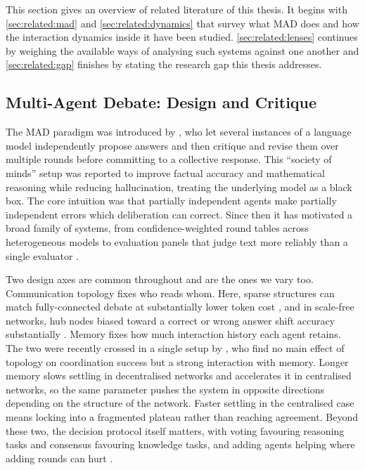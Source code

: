 This section gives an overview of related literature of this thesis. It begins 
with \autoref{sec:related:mad} and \autoref{sec:related:dynamics} that survey what
\ac{MAD} does and how the interaction dynamics inside it have been
studied. \autoref{sec:related:lenses} continues by weighing the available ways of analysing such
systems against one another and \autoref{sec:related:gap} finishes by 
stating the research gap this thesis addresses.

\subsection{Multi-Agent Debate: Design and Critique}
\label{sec:related:mad}

The \ac{MAD} paradigm was introduced by
\citet{du2024improving}, who let several instances of a language model
independently propose answers and then critique and revise them over multiple
rounds before committing to a collective response. This ``society of minds'' setup
was reported to improve factual accuracy and mathematical reasoning while
reducing hallucination, treating the underlying model as a black box. The core
intuition was that partially independent agents make partially independent errors
which deliberation can correct. Since then it has motivated a broad family
of systems, from confidence-weighted round tables across heterogeneous models
\citep{chen2024reconcile} to evaluation panels that judge text more reliably
than a single evaluator \citep{chan2024chateval}.

Two design axes are common throughout and are the ones we vary too.
Communication topology fixes who reads whom. Here, sparse structures can match
fully-connected debate at substantially lower token cost
\citep{li2024sparsetopology}, and in scale-free networks, hub nodes biased toward
a correct or wrong answer shift accuracy substantially \citep{liu2025problemsolving}. Memory
fixes how much interaction history each agent retains. The two were recently
crossed in a single setup by \citet{mehdizadeh2026topologymemory}, who find
no main effect of topology on coordination success but a strong interaction with
memory. Longer memory slows settling in decentralised networks and accelerates
it in centralised networks, so the same parameter pushes the system in opposite
directions depending on the structure of the network. Faster settling in the centralised
case means locking into a fragmented plateau rather than reaching
agreement. Beyond these two, the decision protocol itself matters, with voting
favouring reasoning tasks and consensus favouring knowledge tasks, and adding
agents helping where adding rounds can hurt \citep{kaesberg2025voting}.

